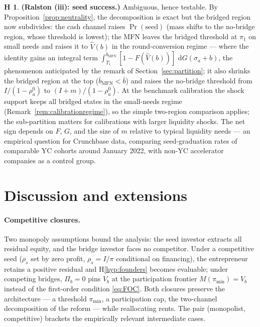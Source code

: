 \documentclass[11pt]{article}
\theoremstyle{definition}
\newtheorem{hypothesis}{H}
\newcommand{\Prob}{\Pr}
\newcommand{\pimin}{\pi_{\min}}
\newcommand{\dd}{\,\mathrm{d}}
\begin{document}
\begin{hypothesis}\label{hyp:seed}
\textbf{(Ralston (iii): seed success.)} Ambiguous, hence testable. By Proposition~\ref{prop:neutrality}, the decomposition is exact but the bridged region now subdivides: the cash channel raises $\Prob(\text{seed})$ (mass shifts to the no-bridge region, whose threshold is lowest); the MFN leaves the bridged threshold at $\pi_1$ on small needs and raises it to $\hat V(b)$ in the round-conversion regime --- where the identity gains an integral term $\int_{T_1}^{\bar b_{\mathrm{MFN}}}[1-F(\hat V(b))]\,\dd G(\sigma_a+b)$, the phenomenon anticipated by the remark of Section~\ref{sec:partition}; it also shrinks the bridged region at the top ($\bar b_{\mathrm{MFN}}<\bar b$) and raises the no-bridge threshold from $I/(1-\rho_a^0)$ to $(I+m)/(1-\rho_a^0)$. At the benchmark calibration the shock support keeps all bridged states in the small-needs regime (Remark~\ref{rem:calibrationregime}), so the simple two-region comparison applies; the sub-partition matters for calibrations with larger liquidity shocks. The net sign depends on $F$, $G$, and the size of $m$ relative to typical liquidity needs --- an empirical question for Crunchbase data, comparing seed-graduation rates of comparable YC cohorts around January 2022, with non-YC accelerator companies as a control group.
\end{hypothesis}



\section{Discussion and extensions}\label{sec:extensions}

\paragraph{Competitive closures.} Two monopoly assumptions bound the analysis: the seed investor extracts all residual equity, and the bridge investor faces no competitor. Under a competitive seed ($\rho_s$ set by zero profit, $\rho_s = I/\pi$ conditional on financing), the entrepreneur retains a positive residual and H\ref{hyp:founders} becomes evaluable; under competing bridges, $\Pi_b = 0$ pins $V_b$ at the participation frontier $M(\pimin) = V_b$ instead of the first-order condition \eqref{eq:FOC}. Both closures preserve the architecture --- a threshold $\pimin$, a participation cap, the two-channel decomposition of the reform --- while reallocating rents. The pair (monopolist, competitive) brackets the empirically relevant intermediate cases.
\end{document}
